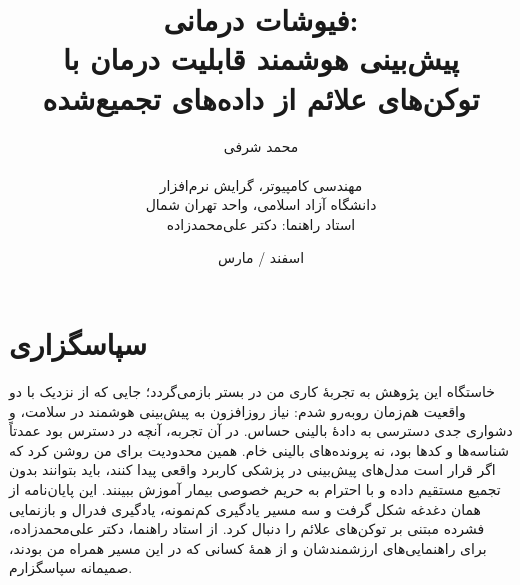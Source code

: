 \renewcommand{\bibname}{مراجع}
\makeatletter
{}%
%
\makeatother

\newenvironment{acknowledgments}
  {\chapter*{سپاسگزاری}}
  {\par\medskip\cleardoublepage}

\pagestyle{fancy}
\fancyhf{}
\fancyhead[LE,RO]{\thepage}
\fancyhead[RE]{\nouppercase{\leftmark}}
\fancyhead[LO]{\nouppercase{\rightmark}}

\title{فیوشات درمانی:\\
پیش‌بینی هوشمند قابلیت درمان با توکن‌های علائم از داده‌های تجمیع‌شده}
\author{محمد شرفی \\[0.35em]
{\normalsize {}} \\[0.65em]
\normalsize مهندسی کامپیوتر، گرایش نرم‌افزار \\
\normalsize دانشگاه آزاد اسلامی، واحد تهران شمال \\[0.5em]
\normalsize استاد راهنما: دکتر علی‌محمدزاده}
\date{اسفند  / مارس }





\cleardoublepage
\ThesisPrelimNumberingStart

\begin{acknowledgments}
خاستگاه این پژوهش به تجربۀ کاری من در بستر  بازمی‌گردد؛ جایی که از نزدیک با دو واقعیت هم‌زمان روبه‌رو شدم: نیاز روزافزون به پیش‌بینی هوشمند در سلامت، و دشواری جدی دسترسی به دادۀ بالینی حساس. در آن تجربه، آنچه در دسترس بود عمدتاً شناسه‌ها و کدها بود، نه پرونده‌های بالینی خام. همین محدودیت برای من روشن کرد که اگر قرار است مدل‌های پیش‌بینی در پزشکی کاربرد واقعی پیدا کنند، باید بتوانند بدون تجمیع مستقیم داده و با احترام به حریم خصوصی بیمار آموزش ببینند. این پایان‌نامه از همان دغدغه شکل گرفت و سه مسیر یادگیری کم‌نمونه، یادگیری فدرال و بازنمایی فشرده مبتنی بر توکن‌های علائم را دنبال کرد. از استاد راهنما، دکتر علی‌محمدزاده، برای راهنمایی‌های ارزشمندشان و از همۀ کسانی که در این مسیر همراه من بودند، صمیمانه سپاسگزارم.
\end{acknowledgments}

